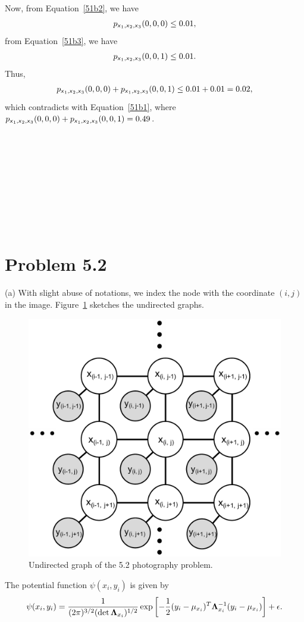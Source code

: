 \documentclass{article}
\newcommand{\s}[1]{\textsf{\textit{#1}}}
\newcommand{\qeds}{\hfill\qedsymbol}
\begin{document}
Now, from Equation~\eqref{51b2}, we have
\begin{align*}
	p_{\s{x}_1, \s{x}_2, \s{x}_3}(0, 0, 0) \leq 0.01,
\end{align*}
from Equation~\eqref{51b3}, we have
\begin{align*}
	p_{\s{x}_1, \s{x}_2, \s{x}_3}(0, 0, 1) \leq 0.01.
\end{align*}
%
Thus, 
\begin{align*}
	p_{\s{x}_1, \s{x}_2, \s{x}_3}(0, 0, 0) + p_{\s{x}_1, \s{x}_2, \s{x}_3}(0, 0, 1) \leq 0.01 + 0.01 = 0.02,
\end{align*}
%
which contradicts with Equation~\eqref{51b1}, where 
$p_{\s{x}_1, \s{x}_2, \s{x}_3}(0, 0, 0) + p_{\s{x}_1, \s{x}_2, \s{x}_3}(0, 0, 1) = 0.49$.
\qeds
\\
\\
\\
\\
\\
\\
\\
\\
\\
\\

\pagebreak
%
\section*{Problem 5.2}
(a) With slight abuse of notations, we index the node with the coordinate
$(i, j)$ in the image. Figure~\ref{f:52a} sketches the undirected graphs.
%
\begin{figure}[h]
  \centering
  \includegraphics[width=0.4\columnwidth]{52a.pdf}
    \vspace{-0.1cm}
  \caption{Undirected graph of the 5.2 photography problem.}
  \label{f:52a}
\end{figure}
%

The potential function $\psi(x_i, y_i)$ is given by
\begin{align*}
	\psi(x_i, y_i) = \frac{1}{(2\pi)^{3/2}(\det {\bf\Lambda}_{x_i})^{1/2}}
	\exp\left[-\frac{1}{2}(y_i-\mu_{x_i})^T\mathbf{\Lambda}^{-1}_{x_i}(y_i - \mu_{x_i})\right] + \epsilon.
\end{align*}
\\
\end{document}
